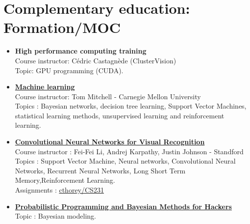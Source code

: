 \documentclass[]{friggeri-cv}
\begin{document}
\section{Complementary education: Formation/MOC}
\begin{itemize}
\item \textbf{High performance computing training} \\
Course instructor: Cédric Castagnède (ClusterVision)\\
Topic: GPU programming (CUDA).

\item            \href{http://www.cs.cmu.edu/~tom/10701_sp11/}{\textbf{Machine
    learning}}\\
 Course instructor: Tom Mitchell - Carnegie Mellon University\\
    Topics : Bayesian networks,  decision tree learning, Support Vector
    Machines, statistical learning  methods, unsupervised learning and
    reinforcement learning.
\item   \href{http://cs231n.github.io/}{\textbf{Convolutional   Neural
    Networks for Visual Recognition}}\\
Course instructor : Fei-Fei Li, Andrej Karpathy, Justin Johnson - Standford\\
Topics : Support Vector  Machine, Neural networks, Convolutional Neural
Networks,    Recurrent    Neural    Networks,    Long    Short    Term
Memory,Reinforcement Learning.\\
Assignments : \href{https://github.com/cthorey/CS231}{cthorey/CS231}
\item
  \href{http://camdavidsonpilon.github.io/Probabilistic-Programming-and-Bayesian-Methods-for-Hackers/}{\textbf{Probabilistic
    Programming and Bayesian Methods for Hackers}}\\
Topic : Bayesian modeling.
\end{itemize}
\end{document}
